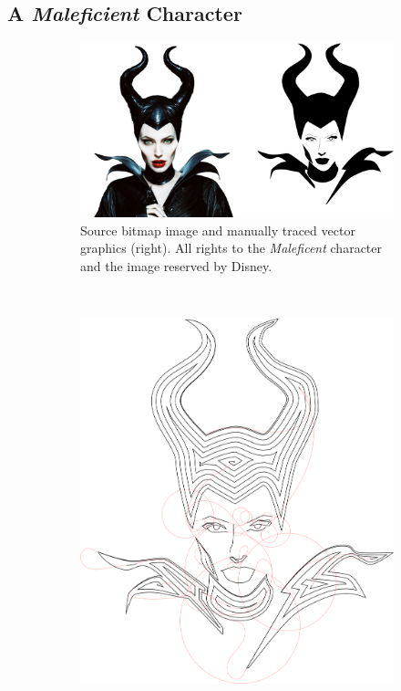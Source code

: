 \subsection{A \textit{Maleficient} Character}

\begin{figure}[h]
\centering
\begin{subfigure}[t]{0.95\textwidth}
\centering
	\includegraphics[width=\textwidth]{images/results/mal/maleficient_source.pdf}
	\caption{Source bitmap image and manually traced vector graphics (right). All rights to the \textit{Maleficent} character and the image reserved by \textcopyright Disney.}
\end{subfigure}\\
\begin{subfigure}[t]{0.95\textwidth}
\centering
	\includegraphics[width=\textwidth]{images/results/mal/maleficient.pdf}

\end{subfigure}
\end{figure}
